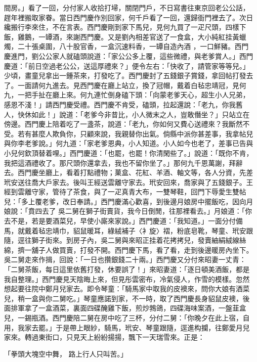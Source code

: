 \begin{showcontents}{}
間房。」看了一回，分付家人收拾打埽，關閉門戶，不日寫書往東京回老公公話，趕年裡搬取家眷。當日西門慶作別回家，何千戶看了一回，還歸衙門裡去了。次日纔搬行李來住，不在言表。西門慶剛到家下馬兒，見何九買了一疋尺頭，四樣下飯，雞鵝，一罈酒，來謝西門慶。又是劉內相差官送了一食盒，大小純紅挂黃蠟燭，二十張桌圍，八十股官香，一盒沉速料香，一罈自造內酒 ，一口鮮豬。西門慶進門，劉公公家人就磕頭說道：「家公公多上覆，這些微禮，與老爹賞人。」西門慶道：「前日空過老公公，送這厚禮來？」便令左右：「快收了，請管家等等兒。」少頃，畫童兒拿出一鍾茶來，打發吃了。西門慶封了五錢銀子賞錢，拿回帖打發去了。一面請何九進去。見西門慶在廳上站立，換了冠帽，戴着白毡忠靖冠，見何九，一把手扯在廳上來。何九連忙倒身磕下頭：「向蒙老爹天心，超生小人兄弟，感恩不淺！」請西門慶受禮。西門慶不肯受，磕頭，拉起還說：「老九，你我舊人，快休如此！」說道：「老爹今非昔比，小人微末之人，豈敢僭坐？」只站立在傍邊。西門慶上陪着吃了一盞茶，說道：「老九，你如何又費心送禮來？我斷然不受。若有甚麼人欺負你，只顧來說，我親替你出氣。倘縣中派你甚差事，我拿帖兒與你李老爹說。」何九道：「家老爹恩典，小人知道。小人如今也老了，差事已告與小兒何欽頂替着哩。」西門慶道：「也罷，也罷！你清閑些了。」說道：「既你不肯，我把這酒禮收了。那尺頭你還拿去，我也不留你坐了。」那何九千恩萬謝，拜辭去。西門慶坐廳上，看着打點禮物；菓盒、花紅、羊酒、軸文等，各人分資，先差玳安送往喬大戶家去。後叫王經送雲離守家去。玳安回來，喬家與了五錢銀子。王經到雲離守家，管待了茶食，與了一疋真青大布，一雙琴鞋，回門下辱愛生雙帖兒：「多上覆老爹，改日奉請。」西門慶滿心歡喜，到後邊月娘房中擺飯吃，因向月娘說：「賁四去了 吳二舅在獅子街賣貨，我今日倒閒，往那裡看去。」月娘道：「你去不是，若是要酒菜兒，早使小廝來家說。」西門慶道：「我知道。」一面分付備馬，就戴着毡忠靖巾，貂鼠暖耳，綠絨補子〈衤旋〉褶，粉底皂靴，琴童、玳安跟隨，逕往獅子街來。到房子內，吳二舅與來昭正挂着花拷拷兒，發賣紬絹絨線絲綿，擠一舖子人做買賣，打發不開。西門慶下馬，看了看，走到後邊暖房內坐下。吳二舅走來作揖，回說：「一日也攢銀錢二十兩。」西門慶又分付來昭妻一丈青：「二舅茶飯，每日這里依舊打發，休要誤了！」來昭妻道：「逐日頓美酒飯，都是我自整理。」西門慶見天陰晦上來，但見彤雲密布，冷氣侵人，作雪的模樣。忽然想起要往院中鄭月兒家去。即令琴童：「騎馬家中取我的皮襖來，問你大娘有酒菜兒，稍一盒與你二舅吃。」琴童應諾到家，不一時，取了西門慶長身貂鼠皮襖，後面排軍拿了一盒酒菜，裏面四碟醃雞下飯，煎炒鵓鴿，四碟海味案酒，一盤韮盒兒，一錫瓶酒。西門慶陪二舅在房中吃了三杯，分付二舅：「你晚夕在此上宿，自用，我家去罷。」于是帶上眼紗，騎馬，玳安、琴童跟隨，逕進构攔，往鄭愛月兒家來。轉過東街口，只見天上紛紛揚揚，飄下一天瑞雪來。正是：

「拳頭大塊空中舞，  路上行人只叫苦。」


\end{showcontents}

